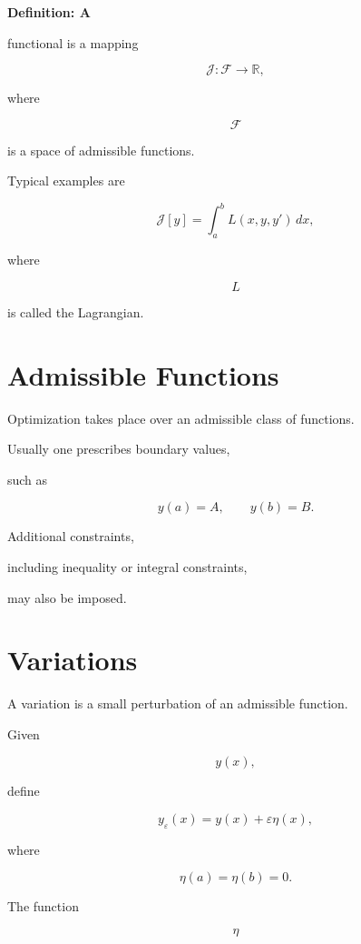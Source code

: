\documentclass[11pt,fleqn]{book}
\numberwithin{equation}{chapter}
\newenvironment{definition}[1]
  {\begin{definitionEnv}
   \noindent\textbf{Definition: #1}\par\smallskip}
  {\end{definitionEnv}}
\theoremstyle{plain}
\theoremstyle{definition}
\theoremstyle{remark}
\begin{document}
\begin{definition}

A functional is a mapping

\[
\mathcal J
:
\mathcal F
\rightarrow
\mathbb R,
\]

where

\[
\mathcal F
\]

is a space of admissible functions.

\end{definition}

Typical examples are

\[
\boxed{
\mathcal J[y]
=
\int_a^b
L(x,y,y')
\,dx,
}
\]

where

\[
L
\]

is called the Lagrangian.


\section{Admissible Functions}

Optimization takes place over an admissible class of functions.

Usually one prescribes boundary values,

such as

\[
y(a)=A,
\qquad
y(b)=B.
\]

Additional constraints,

including inequality or integral constraints,

may also be imposed.


\section{Variations}

A variation is a small perturbation of an admissible function.

Given

\[
y(x),
\]

define

\[
\boxed{
y_\varepsilon(x)
=
y(x)
+
\varepsilon
\eta(x),
}
\]

where

\[
\eta(a)
=
\eta(b)
=
0.
\]

The function

\[
\eta
\]
\end{document}
